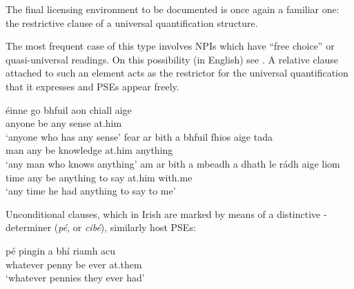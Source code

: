 \documentclass[output=paper,colorlinks,citecolor=brown]{langscibook}
\begin{document}

The final licensing environment to be documented is once again a familiar one: the restrictive clause of a universal quantification structure. 

The most frequent case of this type involves NPIs which have “free choice” or quasi-universal readings. On this possibility (in English) see \citet[163]{horn:00}.  A relative clause attached to such an element acts as the restrictor for the universal quantification that it expresses and PSEs appear freely.

\ea
\ea
\gll éinne go bhfuil aon chiall aige \\
     anyone {\C} {be\pres} any sense at.him \\
\glt `anyone who has any sense'
\ex
\gll fear {ar bith} a bhfuil fhios aige tada \\
     man any {\C} {be\pres} knowledge at.him anything \\
\glt `any man who knows anything'
\ex
\gll am   {ar bith} a mbeadh {a dhath} le rádh aige liom \\
     time  any     {\C} {be\cond}  anything to {say\vn} at.him with.me \\
\glt `any time he had anything to say to me'
\z
\z


Unconditional clauses, which in Irish are marked by means of a distinctive \WH-determiner (\textit{pé}, or \textit{cibé}), similarly host PSEs:

\ea
\gll pé pingin a bhí riamh acu \\
     whatever penny {\C} {be\past} ever at.them \\
\glt `whatever pennies they ever had'
\z
\end{document}
